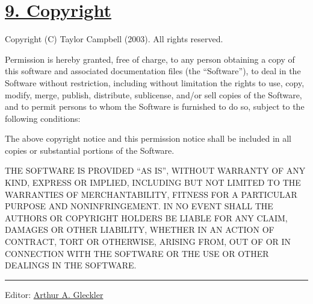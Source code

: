 \section{\texorpdfstring{\href{}{9.
Copyright}}{9. Copyright}}\label{copyright}

Copyright (C) Taylor Campbell (2003). All rights reserved.

Permission is hereby granted, free of charge, to any person obtaining a
copy of this software and associated documentation files (the
``Software''), to deal in the Software without restriction, including
without limitation the rights to use, copy, modify, merge, publish,
distribute, sublicense, and/or sell copies of the Software, and to
permit persons to whom the Software is furnished to do so, subject to
the following conditions:

The above copyright notice and this permission notice shall be included
in all copies or substantial portions of the Software.

THE SOFTWARE IS PROVIDED ``AS IS'', WITHOUT WARRANTY OF ANY KIND,
EXPRESS OR IMPLIED, INCLUDING BUT NOT LIMITED TO THE WARRANTIES OF
MERCHANTABILITY, FITNESS FOR A PARTICULAR PURPOSE AND NONINFRINGEMENT.
IN NO EVENT SHALL THE AUTHORS OR COPYRIGHT HOLDERS BE LIABLE FOR ANY
CLAIM, DAMAGES OR OTHER LIABILITY, WHETHER IN AN ACTION OF CONTRACT,
TORT OR OTHERWISE, ARISING FROM, OUT OF OR IN CONNECTION WITH THE
SOFTWARE OR THE USE OR OTHER DEALINGS IN THE SOFTWARE.

\begin{center}\rule{0.5\linewidth}{\linethickness}\end{center}

Editor:
\href{mailto:srfi\%20minus\%20editors\%20at\%20srfi\%20dot\%20schemers\%20dot\%20org}{Arthur
A. Gleckler}
